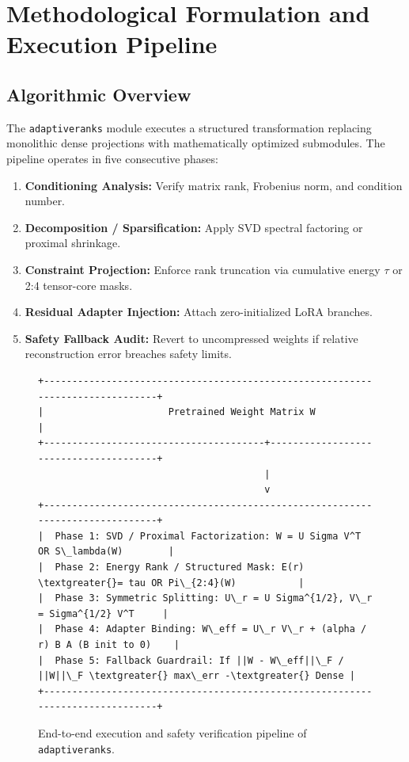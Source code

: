 \section{Methodological Formulation and Execution Pipeline}

\subsection{Algorithmic Overview}
The \texttt{adaptiveranks} module executes a structured transformation replacing monolithic dense projections with mathematically optimized submodules. The pipeline operates in five consecutive phases:
\begin{enumerate}
\item \textbf{Conditioning Analysis:} Verify matrix rank, Frobenius norm, and condition number.
\item \textbf{Decomposition / Sparsification:} Apply SVD spectral factoring or proximal shrinkage.
\item \textbf{Constraint Projection:} Enforce rank truncation via cumulative energy $\tau$ or 2:4 tensor-core masks.
\item \textbf{Residual Adapter Injection:} Attach zero-initialized LoRA branches.
\item \textbf{Safety Fallback Audit:} Revert to uncompressed weights if relative reconstruction error breaches safety limits.
\end{enumerate}

\begin{figure}[t]
\centering
\begin{verbatim}
+-------------------------------------------------------------------------------+
|                      Pretrained Weight Matrix W                               |
+---------------------------------------+---------------------------------------+
                                        |
                                        v
+-------------------------------------------------------------------------------+
|  Phase 1: SVD / Proximal Factorization: W = U Sigma V^T OR S\_lambda(W)        |
|  Phase 2: Energy Rank / Structured Mask: E(r) \textgreater{}= tau OR Pi\_{2:4}(W)           |
|  Phase 3: Symmetric Splitting: U\_r = U Sigma^{1/2}, V\_r = Sigma^{1/2} V^T     |
|  Phase 4: Adapter Binding: W\_eff = U\_r V\_r + (alpha / r) B A (B init to 0)    |
|  Phase 5: Fallback Guardrail: If ||W - W\_eff||\_F / ||W||\_F \textgreater{} max\_err -\textgreater{} Dense |
+-------------------------------------------------------------------------------+
\end{verbatim}
\caption{End-to-end execution and safety verification pipeline of \texttt{adaptiveranks}.}
\end{figure}

